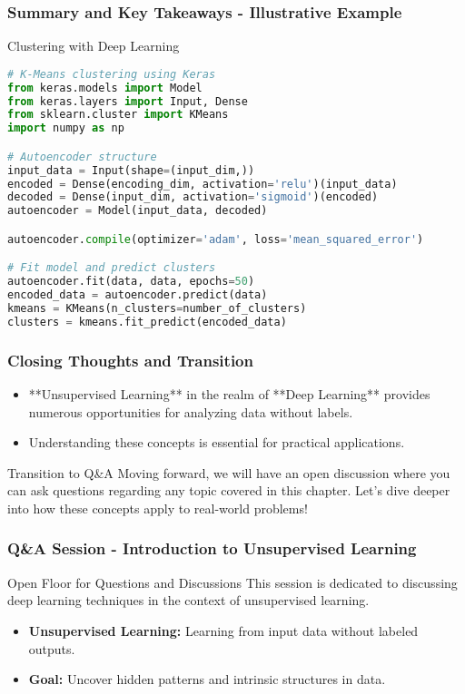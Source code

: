 \documentclass[aspectratio=169]{beamer}
\begin{document}
\begin{frame}[fragile]
    \frametitle{Summary and Key Takeaways - Illustrative Example}
    \begin{block}{Clustering with Deep Learning}
        \begin{lstlisting}[language=Python]
# K-Means clustering using Keras
from keras.models import Model
from keras.layers import Input, Dense
from sklearn.cluster import KMeans
import numpy as np

# Autoencoder structure
input_data = Input(shape=(input_dim,))
encoded = Dense(encoding_dim, activation='relu')(input_data)
decoded = Dense(input_dim, activation='sigmoid')(encoded)
autoencoder = Model(input_data, decoded)

autoencoder.compile(optimizer='adam', loss='mean_squared_error')

# Fit model and predict clusters
autoencoder.fit(data, data, epochs=50)
encoded_data = autoencoder.predict(data)
kmeans = KMeans(n_clusters=number_of_clusters)
clusters = kmeans.fit_predict(encoded_data)
        \end{lstlisting}
    \end{block}
\end{frame}

\begin{frame}[fragile]
    \frametitle{Closing Thoughts and Transition}
    \begin{itemize}
        \item **Unsupervised Learning** in the realm of **Deep Learning** provides numerous opportunities for analyzing data without labels.
        \item Understanding these concepts is essential for practical applications.
    \end{itemize}
    \begin{block}{Transition to Q\&A}
        Moving forward, we will have an open discussion where you can ask questions regarding any topic covered in this chapter. Let's dive deeper into how these concepts apply to real-world problems!
    \end{block}
\end{frame}

\begin{frame}[fragile]
  \frametitle{Q\&A Session - Introduction to Unsupervised Learning}
  \begin{block}{Open Floor for Questions and Discussions}
    This session is dedicated to discussing deep learning techniques in the context of unsupervised learning.
  \end{block}
  
  \begin{itemize}
    \item \textbf{Unsupervised Learning:} Learning from input data without labeled outputs.
    \item \textbf{Goal:} Uncover hidden patterns and intrinsic structures in data.
  \end{itemize}
  
\end{frame}
\end{document}
